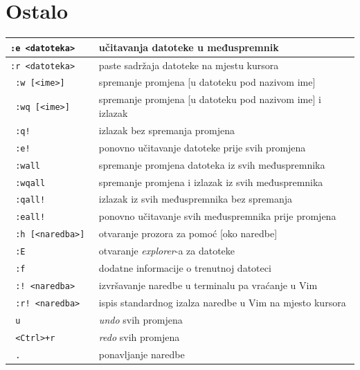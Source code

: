 \documentclass[10pt]{article}
\begin{document}
    \section*{\color{ForestGreen} Ostalo}
    \begin{tabular}{|>{\tt}p{9.00cm}|>{}p{15.50cm}|}
        \hline
        :e <datoteka>                   & učitavanja datoteke u međuspremnik                                  \\ \hline
        :r <datoteka>                   & paste sadržaja datoteke na mjestu kursora                           \\ \hline
        :w [<ime>]                      & spremanje promjena [u datoteku pod nazivom ime]                     \\ \hline
        :wq [<ime>]                     & spremanje promjena [u datoteku pod nazivom ime] i izlazak           \\ \hline
        :q!                             & izlazak bez spremanja promjena                                      \\ \hline
        :e!                             & ponovno učitavanje datoteke prije svih promjena                     \\ \hline
        :wall                           & spremanje promjena datoteka iz svih međuspremnika                   \\ \hline
        :wqall                          & spremanje promjena i izlazak iz svih međuspremnika                  \\ \hline
        :qall!                          & izlazak iz svih međuspremnika bez spremanja                         \\ \hline
        :eall!                          & ponovno učitavanje svih međuspremnika prije promjena                \\ \hline
        :h [<naredba>]                  & otvaranje prozora za pomoć [oko naredbe]                            \\ \hline
        :E                              & otvaranje \textit{explorer}-a za datoteke                           \\ \hline
        :f                              & dodatne informacije o trenutnoj datoteci                            \\ \hline
        :! <naredba>                    & izvršavanje naredbe u terminalu pa vraćanje u Vim                   \\ \hline
        :r! <naredba>                   & ispis standardnog izalza naredbe u Vim na mjesto kursora            \\ \hline
        u                               & \textit{undo} svih promjena                                         \\ \hline
        <Ctrl>+r                        & \textit{redo} svih promjena                                         \\ \hline
        .                               & ponavljanje naredbe                                                 \\ \hline
    \end{tabular}         
    \newpage              
\end{document}

